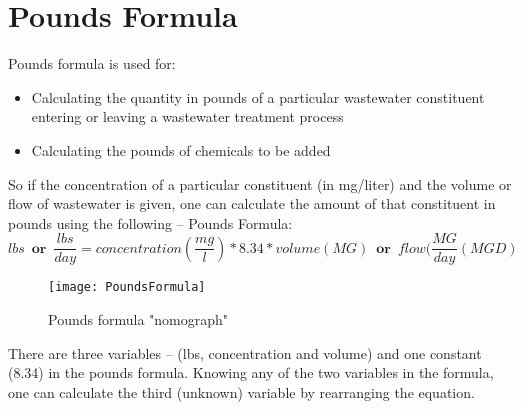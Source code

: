 
\section{Pounds Formula}



Pounds formula is used for:
\begin{itemize}
\item Calculating the quantity in pounds of a particular wastewater constituent entering or leaving a wastewater treatment process
\item Calculating the pounds of chemicals to be added\\
\end{itemize}
So if the concentration of a particular constituent (in mg/liter) and the volume or flow of wastewater is given, one can calculate the amount of that constituent in pounds using the following – Pounds Formula:
$$lbs \enspace \textbf{or} \enspace \dfrac{lbs}{day}=concentration(\dfrac{mg}{l})*8.34*volume(MG) \enspace \textbf{or} \enspace flow(\dfrac{MG}{day}(MGD)$$

\begin{figure}[h!]
\begin{center}
\texttt{[image: PoundsFormula]}
\end{center}
\caption{Pounds formula "nomograph"}
\end{figure}
\vspace{0.3cm}
There are three variables – (lbs, concentration and volume) and one constant (8.34) in the pounds formula.  Knowing any of the two variables in the formula, one can calculate the third (unknown) variable by rearranging the equation.
